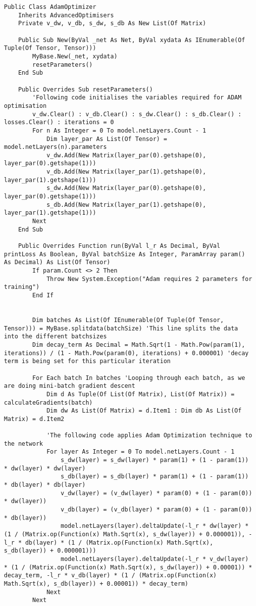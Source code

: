 \begin{verbatim}
Public Class AdamOptimizer
    Inherits AdvancedOptimisers
    Private v_dw, v_db, s_dw, s_db As New List(Of Matrix)

    Public Sub New(ByVal _net As Net, ByVal xydata As IEnumerable(Of Tuple(Of Tensor, Tensor)))
        MyBase.New(_net, xydata)
        resetParameters()
    End Sub

    Public Overrides Sub resetParameters()
        'Following code initialises the variables required for ADAM optimisation
        v_dw.Clear() : v_db.Clear() : s_dw.Clear() : s_db.Clear() : losses.Clear() : iterations = 0
        For n As Integer = 0 To model.netLayers.Count - 1
            Dim layer_par As List(Of Tensor) = model.netLayers(n).parameters
            v_dw.Add(New Matrix(layer_par(0).getshape(0), layer_par(0).getshape(1)))
            v_db.Add(New Matrix(layer_par(1).getshape(0), layer_par(1).getshape(1)))
            s_dw.Add(New Matrix(layer_par(0).getshape(0), layer_par(0).getshape(1)))
            s_db.Add(New Matrix(layer_par(1).getshape(0), layer_par(1).getshape(1)))
        Next
    End Sub

    Public Overrides Function run(ByVal l_r As Decimal, ByVal printLoss As Boolean, ByVal batchSize As Integer, ParamArray param() As Decimal) As List(Of Tensor)
        If param.Count <> 2 Then
            Throw New System.Exception("Adam requires 2 parameters for training")
        End If


        Dim batches As List(Of IEnumerable(Of Tuple(Of Tensor, Tensor))) = MyBase.splitdata(batchSize) 'This line splits the data into the different batchsizes
        Dim decay_term As Decimal = Math.Sqrt(1 - Math.Pow(param(1), iterations)) / (1 - Math.Pow(param(0), iterations) + 0.000001) 'decay term is being set for this particular iteration

        For Each batch In batches 'Looping through each batch, as we are doing mini-batch gradient descent
            Dim d As Tuple(Of List(Of Matrix), List(Of Matrix)) = calculateGradients(batch)
            Dim dw As List(Of Matrix) = d.Item1 : Dim db As List(Of Matrix) = d.Item2

            'The following code applies Adam Optimization technique to the network
            For layer As Integer = 0 To model.netLayers.Count - 1
                s_dw(layer) = s_dw(layer) * param(1) + (1 - param(1)) * dw(layer) * dw(layer)
                s_db(layer) = s_db(layer) * param(1) + (1 - param(1)) * db(layer) * db(layer)
                v_dw(layer) = (v_dw(layer) * param(0) + (1 - param(0)) * dw(layer))
                v_db(layer) = (v_db(layer) * param(0) + (1 - param(0)) * db(layer))
                model.netLayers(layer).deltaUpdate(-l_r * dw(layer) * (1 / (Matrix.op(Function(x) Math.Sqrt(x), s_dw(layer)) + 0.000001)), -l_r * db(layer) * (1 / (Matrix.op(Function(x) Math.Sqrt(x), s_db(layer)) + 0.000001)))
                model.netLayers(layer).deltaUpdate(-l_r * v_dw(layer) * (1 / (Matrix.op(Function(x) Math.Sqrt(x), s_dw(layer)) + 0.00001)) * decay_term, -l_r * v_db(layer) * (1 / (Matrix.op(Function(x) Math.Sqrt(x), s_db(layer)) + 0.00001)) * decay_term)
            Next
        Next


\end{verbatim}
